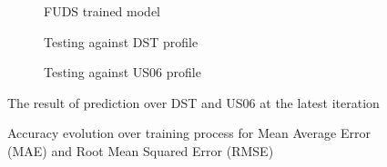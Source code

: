     \begin{figure}[htbp]
        \centering
        \begin{subfigure}[b]{0.325\textwidth}
            \centering
            
            \caption{FUDS trained model}
            \label{subfig:FUDS_diff_prof_compare}
        \end{subfigure}
        \hfill
        \begin{subfigure}[b]{0.325\textwidth}
            \centering
            
            \caption{Testing against DST profile}
            \label{subfig:DST_diff_prof_compare}
        \end{subfigure}
        \hfill
        \begin{subfigure}[b]{0.325\textwidth}
            \centering
            
            \caption{Testing against US06 profile}
            \label{subfig:US_diff_prof_compare}
        \end{subfigure}
        \caption{The result of prediction over DST and US06 at the latest iteration}
        \label{fig:diff_prof_compare}
    \end{figure}
    \begin{figure}
        \centering
        
        \caption{Accuracy evolution over training process for Mean Average Error (MAE) and Root Mean Squared Error (RMSE)}
        \label{fig:res_performance}
    \end{figure}
